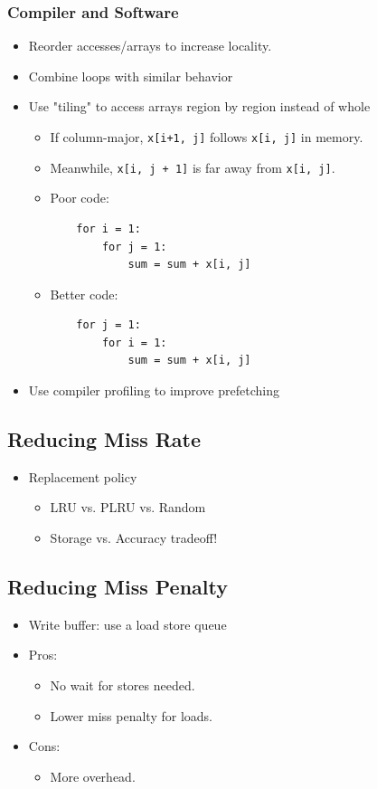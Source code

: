 \documentclass[10pt]{article}
\begin{document}
\subsubsection*{Compiler and Software}
\begin{itemize}
    \item Reorder accesses/arrays to increase locality.
    \item Combine loops with similar behavior
    \item Use "tiling" to access arrays region by region instead of whole
    \begin{itemize}
        \item If column-major, \texttt{x[i+1, j]} follows \texttt{x[i, j]} in memory.
        \item Meanwhile, \texttt{x[i, j + 1]} is far away from \texttt{x[i, j]}.
        \item Poor code:
\begin{verbatim}
    for i = 1:
        for j = 1:
            sum = sum + x[i, j]
\end{verbatim}
        \item Better code:
\begin{verbatim}
    for j = 1:
        for i = 1:
            sum = sum + x[i, j]
\end{verbatim}
    \end{itemize}
    \item Use compiler profiling to improve prefetching
\end{itemize}

\subsection*{Reducing Miss Rate}
\begin{itemize}
    \item Replacement policy
    \begin{itemize}
        \item LRU vs. PLRU vs. Random
        \item Storage vs. Accuracy tradeoff!
    \end{itemize}
\end{itemize}

\subsection*{Reducing Miss Penalty}
\begin{itemize}
    \item Write buffer: use a load store queue
    \item Pros:
    \begin{itemize}
        \item No wait for stores needed.
        \item Lower miss penalty for loads.
    \end{itemize}
    \item Cons:
    \begin{itemize}
        \item More overhead.
    \end{itemize}
\end{itemize}
\end{document}
